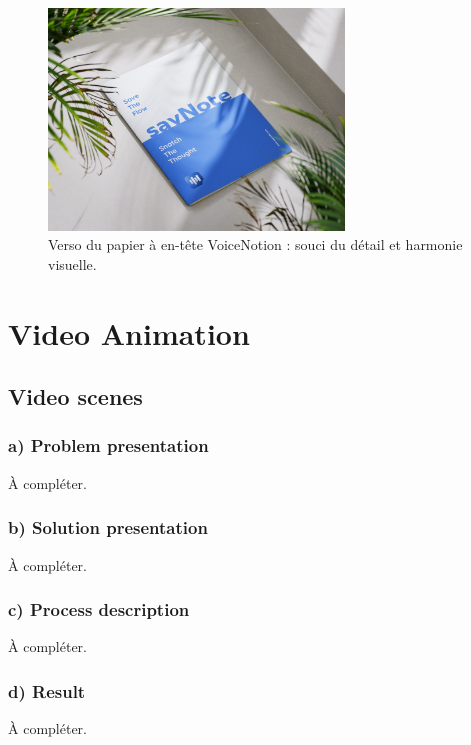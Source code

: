 \begin{figure}[H]
    \centering
    \includegraphics[width=0.7\textwidth]{docs/visual-indentity/pictures/pappier-back.jpg}
    \caption{Verso du papier à en-tête VoiceNotion : souci du détail et harmonie visuelle.}
\end{figure}


\section{Video Animation}
\subsection{Video scenes}
\subsubsection*{a) Problem presentation}
À compléter.
\subsubsection*{b) Solution presentation}
À compléter.
\subsubsection*{c) Process description}
À compléter.
\subsubsection*{d) Result}
À compléter.

